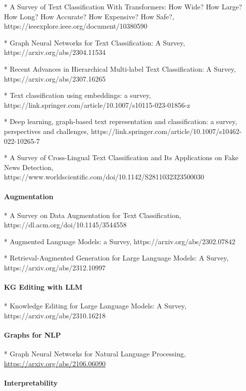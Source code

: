 * A Survey of Text Classification With Transformers: How Wide? How Large? How Long? How Accurate? How Expensive? How Safe?, https://ieeexplore.ieee.org/document/10380590

* Graph Neural Networks for Text Classification: A Survey, https://arxiv.org/abs/2304.11534

* Recent Advances in Hierarchical Multi-label Text Classification: A Survey, https://arxiv.org/abs/2307.16265

* Text classification using embeddings: a survey, https://link.springer.com/article/10.1007/s10115-023-01856-z

* Deep learning, graph-based text representation and classification: a survey, perspectives and challenges, https://link.springer.com/article/10.1007/s10462-022-10265-7

* A Survey of Cross-Lingual Text Classification and Its Applications on Fake News Detection, https://www.worldscientific.com/doi/10.1142/S2811032323500030

\paragraph{Augmentation}

* A Survey on Data Augmentation for Text Classification, https://dl.acm.org/doi/10.1145/3544558

* Augmented Language Models: a Survey, https://arxiv.org/abs/2302.07842

* Retrieval-Augmented Generation for Large Language Models: A Survey, https://arxiv.org/abs/2312.10997
 
\paragraph{KG Editing with LLM}

* Knowledge Editing for Large Language Models: A Survey, https://arxiv.org/abs/2310.16218

\paragraph{Graphs for NLP}

* Graph Neural Networks for Natural Language Processing, \url{https://arxiv.org/abs/2106.06090}

\paragraph{Interpretability}

